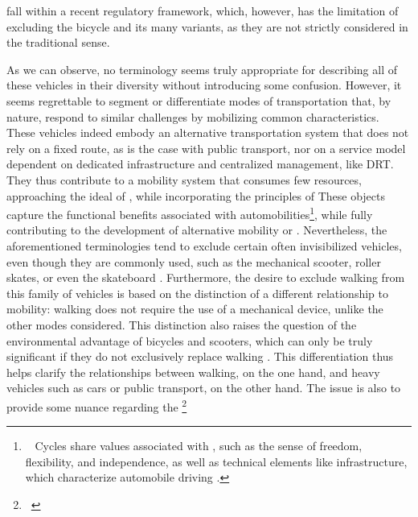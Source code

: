 \begin{refsegment}
{} fall within a recent regulatory framework, which, however, has the limitation of excluding the bicycle and its many variants, as they are not strictly considered  in the traditional sense.%

As we can observe, no terminology seems truly appropriate for describing all of these vehicles in their diversity without introducing some confusion. However, it seems regrettable to segment or differentiate modes of transportation that, by nature, respond to similar challenges by mobilizing common characteristics. These vehicles indeed embody an alternative transportation system that does not rely on a fixed route, as is the case with public transport, nor on a service model dependent on dedicated infrastructure and centralized management, like \acrfull{DRT}. They thus contribute to a mobility system that consumes few resources, approaching the ideal of  \textcolor{blue}{\autocite[5]{itdp_electric_2019}}, while incorporating the principles of  These objects capture the functional benefits associated with automobilities\footnote{~
    Cycles share values associated with  \textcolor{blue}{\autocites[57-58]{urry_sociology_2000}[28]{urry_system_2004}}, such as the sense of freedom, flexibility, and independence, as well as technical elements like infrastructure, which characterize automobile driving \textcolor{blue}{\autocite[12]{heran_reduction_2001}}.
}, while fully contributing to the development of alternative mobility or  \textcolor{blue}{\autocites[25]{amar_homo_2016}{heran_transition_2018}}. Nevertheless, the aforementioned terminologies tend to exclude certain often invisibilized vehicles, even though they are commonly used, such as the mechanical scooter, roller skates, or even the skateboard \textcolor{blue}{\autocite[19]{sebban_complementarite_2003}}. Furthermore, the desire to exclude walking from this family of vehicles is based on the distinction of a different relationship to mobility: walking does not require the use of a mechanical device, unlike the other modes considered. This distinction also raises the question of the environmental advantage of bicycles and scooters, which can only be truly significant if they do not exclusively replace walking \textcolor{blue}{\autocite[12]{dezobry_du_2020}}. This differentiation thus helps clarify the relationships between walking, on the one hand, and heavy vehicles such as cars or public transport, on the other hand. The issue is also to provide some nuance regarding the \footnote{~
}
\end{refsegment}
